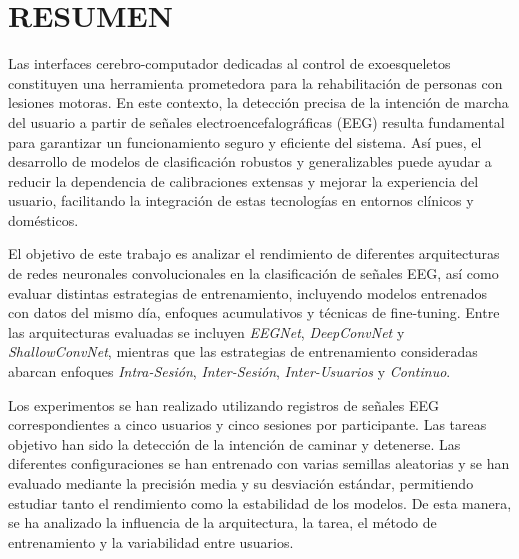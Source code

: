 
\newpage
\section*{RESUMEN} %

Las interfaces cerebro-computador dedicadas al control de exoesqueletos constituyen una herramienta prometedora para la rehabilitación de personas con lesiones motoras. En este contexto, la detección precisa de la intención de marcha del usuario a partir de señales electroencefalográficas (EEG) resulta fundamental para garantizar un funcionamiento seguro y eficiente del sistema. Así pues, el desarrollo de modelos de clasificación robustos y generalizables puede ayudar a reducir la dependencia de calibraciones extensas y mejorar la experiencia del usuario, facilitando la integración de estas tecnologías en entornos clínicos y domésticos.

El objetivo de este trabajo es analizar el rendimiento de diferentes arquitecturas de redes neuronales convolucionales en la clasificación de señales EEG, así como evaluar distintas estrategias de entrenamiento, incluyendo modelos entrenados con datos del mismo día, enfoques acumulativos y técnicas de fine-tuning. Entre las arquitecturas evaluadas se incluyen \textit{EEGNet}, \textit{DeepConvNet} y \textit{ShallowConvNet}, mientras que las estrategias de entrenamiento consideradas abarcan enfoques \textit{Intra-Sesión}, \textit{Inter-Sesión}, \textit{Inter-Usuarios} y \textit{Continuo}.

Los experimentos se han realizado utilizando registros de señales EEG correspondientes a cinco usuarios y cinco sesiones por participante. Las tareas objetivo han sido la detección de la intención de caminar y detenerse. Las diferentes configuraciones se han entrenado con varias semillas aleatorias y se han evaluado mediante la precisión media y su desviación estándar, permitiendo estudiar tanto el rendimiento como la estabilidad de los modelos. De esta manera, se ha analizado la influencia de la arquitectura, la tarea, el método de entrenamiento y la variabilidad entre usuarios.

